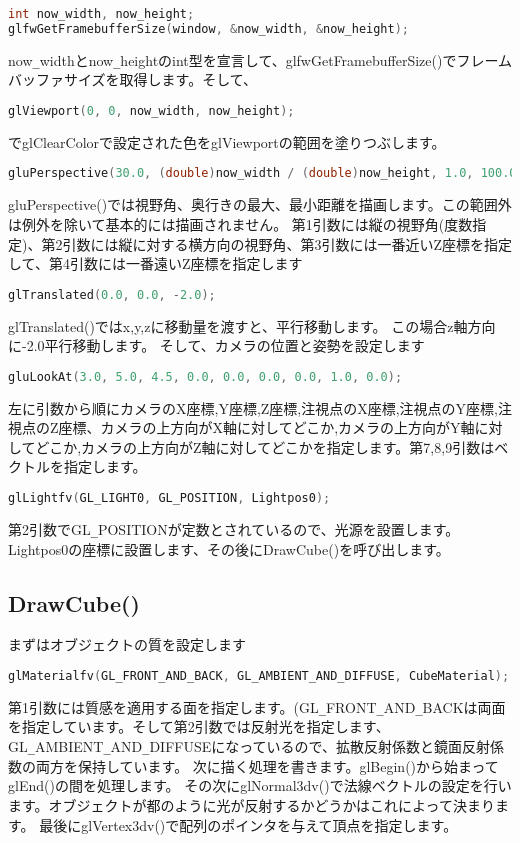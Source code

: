 \documentclass[a4paper,titlepage]{jsarticle}
\begin{document}
\begin{lstlisting}[language=C++]
int now_width, now_height;
glfwGetFramebufferSize(window, &now_width, &now_height);
\end{lstlisting}
now\verb|_|widthとnow\verb|_|heightのint型を宣言して、glfwGetFramebufferSize()でフレームバッファサイズを取得します。そして、
\begin{lstlisting}[language=C++]
glViewport(0, 0, now_width, now_height);
\end{lstlisting}
でglClearColorで設定された色をglViewportの範囲を塗りつぶします。
\begin{lstlisting}[language=C++]
gluPerspective(30.0, (double)now_width / (double)now_height, 1.0, 100.0);
\end{lstlisting}
gluPerspective()では視野角、奥行きの最大、最小距離を描画します。この範囲外は例外を除いて基本的には描画されません。
第1引数には縦の視野角(度数指定)、第2引数には縦に対する横方向の視野角、第3引数には一番近いZ座標を指定して、第4引数には一番遠いZ座標を指定します
\begin{lstlisting}[language=C++]
glTranslated(0.0, 0.0, -2.0);
\end{lstlisting}
glTranslated()ではx,y,zに移動量を渡すと、平行移動します。
この場合z軸方向に-2.0平行移動します。
そして、カメラの位置と姿勢を設定します
\begin{lstlisting}[language=C++]
gluLookAt(3.0, 5.0, 4.5, 0.0, 0.0, 0.0, 0.0, 1.0, 0.0);
\end{lstlisting}
左に引数から順にカメラのX座標,Y座標,Z座標,注視点のX座標,注視点のY座標,注視点のZ座標、カメラの上方向がX軸に対してどこか,カメラの上方向がY軸に対してどこか,カメラの上方向がZ軸に対してどこかを指定します。第7,8,9引数はベクトルを指定します。
\begin{lstlisting}[language=C++]
glLightfv(GL_LIGHT0, GL_POSITION, Lightpos0);
\end{lstlisting}
第2引数でGL\verb|_|POSITIONが定数とされているので、光源を設置します。Lightpos0の座標に設置します、その後にDrawCube()を呼び出します。

\subsection{DrawCube()}
まずはオブジェクトの質を設定します
\begin{lstlisting}[language=C++]
glMaterialfv(GL_FRONT_AND_BACK, GL_AMBIENT_AND_DIFFUSE, CubeMaterial);
\end{lstlisting}
第1引数には質感を適用する面を指定します。(GL\verb|_|FRONT\verb|_|AND\verb|_|BACKは両面を指定しています。そして第2引数では反射光を指定します、GL\verb|_|AMBIENT\verb|_|AND\verb|_|DIFFUSEになっているので、拡散反射係数と鏡面反射係数の両方を保持しています。
次に描く処理を書きます。glBegin()から始まってglEnd()の間を処理します。
その次にglNormal3dv()で法線ベクトルの設定を行います。オブジェクトが都のように光が反射するかどうかはこれによって決まります。
最後にglVertex3dv()で配列のポインタを与えて頂点を指定します。
\end{document}
